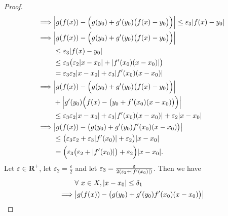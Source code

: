\begin{proof}
\begin{align*}
        \implies & \abs*{g(f(x)) - \Big(g(y_0) + g'(y_0)\big(f(x) - y_0\big)\Big)} \leq \varepsilon_3 \abs*{f(x) - y_0}                   \\
        \implies & \abs*{g(f(x)) - \Big(g(y_0) + g'(y_0)\big(f(x) - y_0\big)\Big)}                                                        \\
                 & \leq \varepsilon_3 \abs*{f(x) - y_0}                                                                                   \\
                 & \leq \varepsilon_3 \big(\varepsilon_2 \abs*{x - x_0} + \abs*{f'(x_0)(x - x_0)}\big)                                    \\
                 & = \varepsilon_3 \varepsilon_2 \abs*{x - x_0} + \varepsilon_3 \abs*{f'(x_0)(x - x_0)}                                   \\
        \implies & \abs*{g(f(x)) - \Big(g(y_0) + g'(y_0)\big(f(x) - y_0\big)\Big)}                                                        \\
                 & + \abs*{g'(y_0) \Big(f(x) - \big(y_0 + f'(x_0)(x - x_0)\big)\Big)}                                                     \\
                 & \leq \varepsilon_3 \varepsilon_2 \abs*{x - x_0} + \varepsilon_3 \abs*{f'(x_0)(x - x_0)} + \varepsilon_2 \abs*{x - x_0} \\
        \implies & \abs*{g(f(x)) - \big(g(y_0) + g'(y_0) f'(x_0) (x - x_0)\big)}                                                          \\
                 & \leq \big(\varepsilon_3 \varepsilon_2 + \varepsilon_3 \abs*{f'(x_0)} + \varepsilon_2\big) \abs*{x - x_0}               \\
                 & = \Big(\varepsilon_3 \big(\varepsilon_2 + \abs*{f'(x_0)}\big) + \varepsilon_2\Big) \abs*{x - x_0}.
    \end{align*}
    Let \(\varepsilon \in \mathbf{R}^+\), let \(\varepsilon_2 = \frac{\varepsilon}{2}\) and let \(\varepsilon_3 = \frac{\varepsilon}{2(\varepsilon_2 + \abs*{f'(x_0)})}\).
    Then we have
    \begin{align*}
                 & \forall\ x \in X, \abs*{x - x_0} \leq \delta_1                                                                                              \\
        \implies & \abs*{g(f(x)) - \big(g(y_0) + g'(y_0) f'(x_0) (x - x_0)\big)}                                                                               \\

\end{align*}
\end{proof}
